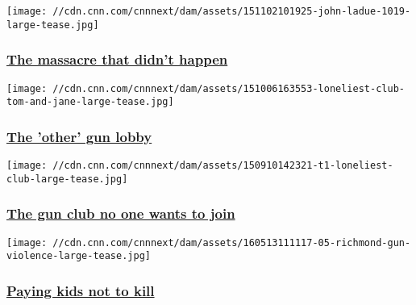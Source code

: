 \href{/2015/11/03/us/minnesota-foiled-school-massacre-john-ladue/index.html}{}

\texttt{[image: //cdn.cnn.com/cnnnext/dam/assets/151102101925-john-ladue-1019-large-tease.jpg]}

\hypertarget{the-massacre-that-didnt-happen}{%
\subsubsection{\texorpdfstring{\href{/2015/11/03/us/minnesota-foiled-school-massacre-john-ladue/index.html}{The
massacre that didn't
happen}}{The massacre that didn't happen}}\label{the-massacre-that-didnt-happen}}

\href{http://www.cnn.com/interactive/2015/10/us/other-gun-lobby/}{}

\texttt{[image: //cdn.cnn.com/cnnnext/dam/assets/151006163553-loneliest-club-tom-and-jane-large-tease.jpg]}

\hypertarget{the-other-gun-lobby}{%
\subsubsection{\texorpdfstring{\href{http://www.cnn.com/interactive/2015/10/us/other-gun-lobby/}{The
'other' gun lobby}}{The 'other' gun lobby}}\label{the-other-gun-lobby}}

\href{http://www.cnn.com/interactive/2015/09/us/the-loneliest-club}{}

\texttt{[image: //cdn.cnn.com/cnnnext/dam/assets/150910142321-t1-loneliest-club-large-tease.jpg]}

\hypertarget{the-gun-club-no-one-wants-to-join}{%
\subsubsection{\texorpdfstring{\href{http://www.cnn.com/interactive/2015/09/us/the-loneliest-club}{The
gun club no one wants to
join}}{The gun club no one wants to join}}\label{the-gun-club-no-one-wants-to-join}}

\href{/2016/05/19/health/cash-for-criminals-richmond-california/index.html}{}

\texttt{[image: //cdn.cnn.com/cnnnext/dam/assets/160513111117-05-richmond-gun-violence-large-tease.jpg]}

\hypertarget{paying-kids-not-to-kill}{%
\subsubsection{\texorpdfstring{\href{/2016/05/19/health/cash-for-criminals-richmond-california/index.html}{Paying
kids not to
kill}}{Paying kids not to kill}}\label{paying-kids-not-to-kill}}

